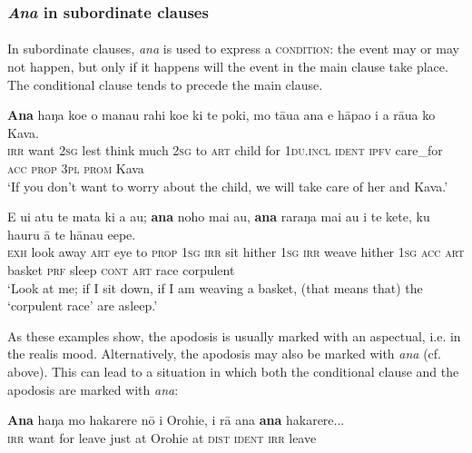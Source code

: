 \subsubsection{\textit{Ana} in subordinate clauses}\label{sec:11.5.2.2}

\paragraph{} In subordinate clauses, \textit{ana} is used to express a \textsc{condition}: the event may or may not happen, but only if it happens will the event in the main clause take place. The conditional clause tends to precede the main clause.

\ea\label{ex:11.179}
\gll \textbf{Ana} haŋa koe {\ꞌ}o mana{\ꞌ}u rahi koe ki te poki, mo tāua {\ꞌ}ana  e hāpa{\ꞌ}o i a rāua ko Kava.\\
\textsc{irr} want \textsc{2sg} lest think much \textsc{2sg} to \textsc{art} child for \textsc{1du.incl} \textsc{ident}  \textsc{ipfv} care\_for \textsc{acc} \textsc{prop} \textsc{3pl} \textsc{prom} Kava\\

\glt 
‘If you don’t want to worry about the child, we will take care of her and Kava.’ \textstyleExampleref{[R229.028]} 
\z

\ea\label{ex:11.180}
\gll E u{\ꞌ}i atu te mata ki a au; \textbf{ana} noho mai au, \textbf{ana} raraŋa mai au i te kete, ku ha{\ꞌ}uru {\ꞌ}ā te hānau {\ꞌ}e{\ꞌ}epe.\\
\textsc{exh} look away \textsc{art} eye to \textsc{prop} \textsc{1sg} \textsc{irr} sit hither \textsc{1sg} \textsc{irr} weave hither \textsc{1sg} \textsc{acc} \textsc{art} basket \textsc{prf} sleep \textsc{cont} \textsc{art} race corpulent\\

\glt
‘Look at me; if I sit down, if I am weaving a basket, (that means that) the ‘corpulent race’ are asleep.’ \textstyleExampleref{[Ley-3-06.025]}
\z

As these examples show, the apodosis is usually marked with an aspectual, i.e. in the realis mood. Alternatively, the apodosis may also be marked with \textit{ana} (cf.  above). This can lead to a situation in which both the conditional clause and the apodosis are marked with \textit{ana}:

\ea\label{ex:11.181}
\gll \textbf{Ana} haŋa mo hakarere nō {\ꞌ}i Orohie, {\ꞌ}i rā {\ꞌ}ana \textbf{ana} hakarere... \\
\textsc{irr} want for leave just at Orohie at \textsc{dist} \textsc{ident} \textsc{irr} leave \\

